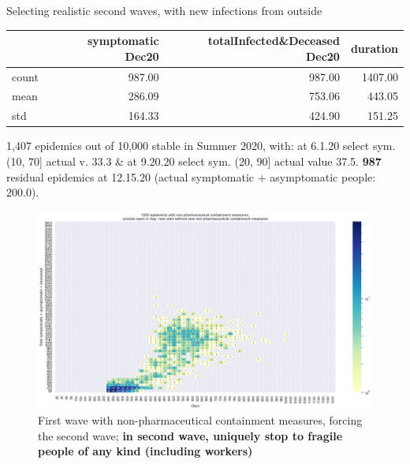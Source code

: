 \documentclass[8pt]{beamer}
\begin{document}
\begin{frame}{Selecting realistic second waves, with new infections from outside}



\begin{table}[H]
\center
\tiny

\begin{tabular}{lrrr}
\toprule
{} &  symptomatic Dec20 &  totalInfected\&Deceased Dec20 &  duration \\
\midrule
count &   987.00 &                     987.00 & 1407.00 \\
mean  &   286.09 &                     753.06 &  443.05 \\
std   &   164.33 &                     424.90 &  151.25 \\
\bottomrule
\end{tabular}

\label{selSpontWave2NoFragTab}
\end{table}

{\tiny
1,407 epidemics out of 10,000  stable in Summer 2020, with: at 6.1.20 select sym. (10, 70] actual v. 33.3 \& at 9.20.20 select sym. (20, 90] actual value 37.5. \textbf{987} residual epidemics at 12.15.20 (actual symptomatic +  asymptomatic people: 200.0).}


\begin{figure}[H]
\center
\includegraphics[scale=0.19]{10kForceWave2NoFrag.png}
\caption{First wave with non-pharmaceutical containment measures, forcing the second wave; \textbf{in second wave, uniquely stop to fragile people of any kind (including workers)}} 
\label{selForceWave2NoFrag}
\end{figure}

\end{frame}
\end{document}
